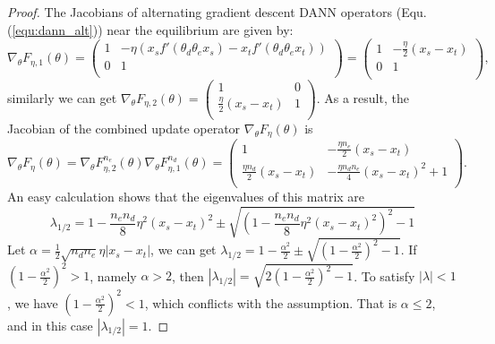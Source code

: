 \documentclass{article} \usepackage{iclr2023_conference,times}
\newcommand{\myref}[1]{Equ. (\ref{#1})}
\begin{document}
\begin{proof}
The Jacobians of alternating gradient descent DANN operators (\myref{equ:dann_alt}) near the equilibrium are given by:
\begin{equation}
\nabla_{\theta} F_{\eta,1}(\theta)=\left(         \begin{array}{cc} 
    1&-\eta\left(x_sf'(\theta_d\theta_ex_s)-x_tf'(\theta_d\theta_ex_t)\right) \\ 
    0&1\\ 
  \end{array}\right)=
  \left(         \begin{array}{cc} 
    1&-\frac{\eta}{2}\left(x_s-x_t\right) \\ 
    0&1\\ 
  \end{array}\right),
\end{equation}
similarly we can get 
$\nabla_{\theta} F_{\eta,2}(\theta)=\left(         \begin{array}{cc} 
    1&0 \\ 
    \frac{\eta}{2}\left(x_s-x_t\right)&1\\ 
  \end{array}\right).$ 
  As a result, the Jacobian of the combined update operator $\nabla_{\theta} F_{\eta}(\theta)$ is
 \begin{equation}
 \nabla_{\theta} F_{\eta}(\theta)=\nabla_{\theta}F^{n_e}_{\eta,2}(\theta)\nabla_{\theta}F^{n_d}_{\eta,1}(\theta)=\left(         \begin{array}{cc} 
    1&-\frac{\eta n_e}{2}\left(x_s-x_t\right) \\ 
    \frac{\eta n_d}{2}\left(x_s-x_t\right)&-\frac{\eta n_dn_e} {4}\left(x_s-x_t\right)^2+1\\ 
  \end{array}\right).    
 \end{equation}
An easy calculation shows that the eigenvalues of this matrix are
\begin{equation}
\lambda_{1/2}=1-\frac{n_en_d}{8}\eta^2(x_s-x_t)^2\pm \sqrt{\left(1-\frac{n_en_d}{8}\eta^2(x_s-x_t)^2\right)^2-1}
\end{equation}
Let $\alpha=\frac{1}{2}\sqrt{n_dn_e}\eta|x_s-x_t|$, we can get $\lambda_{1/2}=1-\frac{\alpha^2}{2}\pm\sqrt{\left(1-\frac{\alpha^2}{2}\right)^2-1}$. If $\left(1-\frac{\alpha^2}{2}\right)^2>1$, namely $\alpha>2$, then $|\lambda_{1/2}|=\sqrt{2\left(1-\frac{\alpha^2}{2}\right)^2-1}$. To satisfy $|\lambda|<1$, we have $\left(1-\frac{\alpha^2}{2}\right)^2<1$, which conflicts with the assumption. That is $\alpha\leq 2$, and in this case $|\lambda_{1/2}|=1$.
\end{proof}
\end{document}
